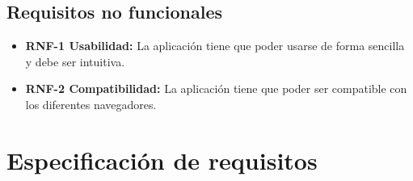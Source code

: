 \subsection{Requisitos no funcionales}
\begin{itemize}
	\item \textbf{RNF-1 Usabilidad:} La aplicación tiene que poder usarse de forma sencilla y debe ser intuitiva.
	\item \textbf{RNF-2 Compatibilidad:} La aplicación tiene que poder ser compatible con los diferentes navegadores.
\end{itemize}

\section{Especificación de requisitos}



